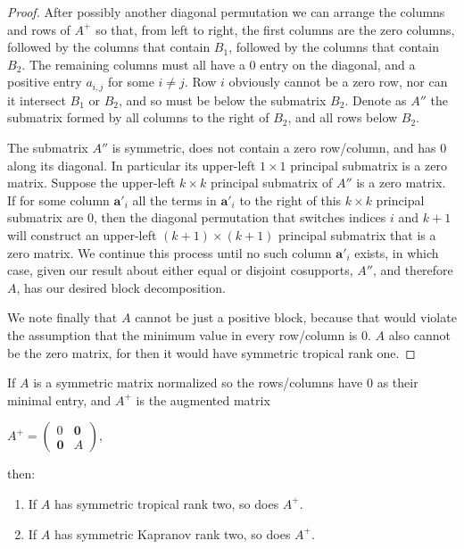 \documentclass{article}
\begin{document}
\begin{proof}
  After possibly another diagonal permutation we can arrange the columns and rows of $A^{+}$ so that, from left to right, the first columns are the zero columns, followed by the columns that contain $B_{1}$, followed by the columns that contain $B_{2}$. The remaining columns must all have a $0$ entry on the diagonal, and a positive entry $a_{i,j}$ for some $i \neq j$. Row $i$ obviously cannot be a zero row, nor can it intersect $B_{1}$ or $B_{2}$, and so must be below the submatrix $B_{2}$. Denote as $A''$ the submatrix formed by all columns to the right of $B_{2}$, and all rows below $B_{2}$.
  
  The submatrix $A''$ is symmetric, does not contain a zero row/column, and has $0$ along its diagonal. In particular its upper-left $1 \times 1$ principal submatrix is a zero matrix. Suppose the upper-left $k \times k$ principal submatrix of $A''$ is a zero matrix. If for some column $\textbf{a}'_{i}$ all the terms in $\textbf{a}'_{i}$ to the right of this $k \times k$ principal submatrix are $0$, then the diagonal permutation that switches indices $i$ and $k+1$ will construct an upper-left $(k+1) \times (k+1)$ principal submatrix that is a zero matrix. We continue this process until no such column $\textbf{a}'_{i}$ exists, in which case, given our result about either equal or disjoint cosupports, $A''$, and therefore $A$, has our desired block decomposition. 
  
  We note finally that $A$ cannot be just a positive block, because that would violate the assumption that the minimum value in every row/column is $0$. $A$ also cannot be the zero matrix, for then it would have symmetric tropical rank one.
\end{proof}

\begin{lem}
  If $A$ is a symmetric matrix normalized so the rows/columns have $0$ as their minimal entry, and $A^{+}$ is the augmented matrix
  
  \begin{center}
    
    $A^{+} = \left(\begin{array}{cc} 0 & \textbf{0} \\ \textbf{0} & A \end{array}\right)$,
    
  \end{center}
  
  then:
  
  \begin{enumerate}
    
  \item If $A$ has symmetric tropical rank two, so does $A^{+}$.
    
  \item If $A$ has symmetric Kapranov rank two, so does $A^{+}$.
    
  \end{enumerate}
\end{lem}
\end{document}
